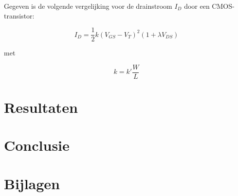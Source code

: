 \documentclass{article}
\begin{document}
Gegeven is de volgende vergelijking voor de drainstroom $I_{D}$ door een CMOS-transistor:

\begin{equation}
	I_{D} = \frac{1}{2} k (V_{GS} - V_{T})^2(1 + \lambda V_{DS})
\end{equation}

met

\begin{equation}
	k = k' \frac{W}{L}
\end{equation}

\section{Resultaten}
\label{sec:ump-res}

\section{Conclusie}
\label{sec:ump-conclusie}

\printbibliography

\section{Bijlagen}
\label{sec:ump-bijlagen}
\end{document}
